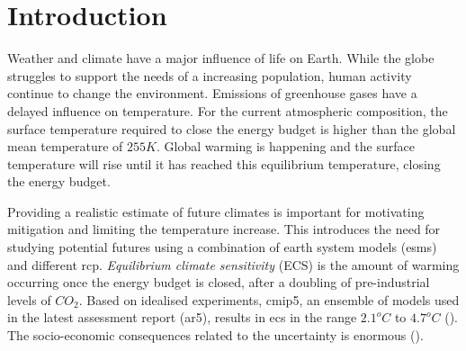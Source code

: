 \chapter{Introduction} \label{ch:introduction}
Weather and climate have a major influence of life on Earth. While the globe struggles to support the needs of a increasing population, human activity continue to change the environment. Emissions of greenhouse gases have a delayed influence on temperature. For the current atmospheric composition, the surface temperature required to close the energy budget is higher than the global mean temperature of $255K$.
Global warming is happening and the surface temperature will rise until it has reached this equilibrium temperature, closing the energy budget. 

Providing a realistic estimate of future climates is important for motivating mitigation and limiting the temperature increase. This introduces the need for studying potential futures using a combination of earth system models (\acrshort{esm}s) and different \acrfull{rcp}. \textit{Equilibrium climate sensitivity} (ECS) is the amount of warming occurring once the energy budget is closed, after a doubling of pre-industrial levels of $CO_2$. Based on idealised experiments, \acrfull{cmip5}, an ensemble of models used in the latest assessment report (\acrshort{ar5}), results in \acrshort{ecs} in the range $2.1^oC$ to $4.7^oC$ (\cite{IPCC_CH9_climate_models}). 
The socio-economic consequences related to the uncertainty is enormous (\cite{bony2015}). 




